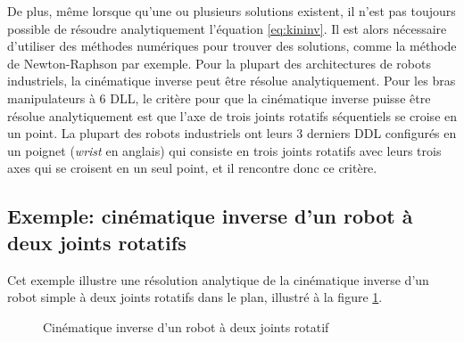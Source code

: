 De plus, même lorsque qu'une ou plusieurs solutions existent, il n'est pas toujours possible de résoudre analytiquement l'équation \eqref{eq:kininv}. Il est alors nécessaire d'utiliser des méthodes numériques pour trouver des solutions, comme la méthode de Newton-Raphson par exemple. Pour la plupart des architectures de robots industriels, la cinématique inverse peut être résolue analytiquement. Pour les bras manipulateurs à 6 DLL, le critère pour que la cinématique inverse puisse être résolue analytiquement est que l'axe de trois joints rotatifs séquentiels se croise en un point. La plupart des robots industriels ont leurs 3 derniers DDL configurés en un poignet (\textit{wrist} en anglais) qui consiste en trois joints rotatifs avec leurs trois axes qui se croisent en un seul point, et il rencontre donc ce critère.


\subsection{Exemple: cinématique inverse d'un robot à deux joints rotatifs}

Cet exemple illustre une résolution analytique de la cinématique inverse d'un robot simple à deux joints rotatifs dans le plan, illustré à la figure \ref{fig:invkin}.

\begin{figure}[htbp]
        \centering
				\hspace{10pt}
        \caption{Cinématique inverse d'un robot à deux joints rotatif }
				\label{fig:invkin}
\end{figure}

